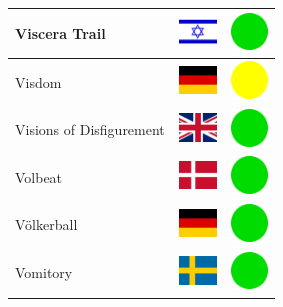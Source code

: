 \documentclass[12pt, a4paper, twoside]{report}
\begin{document}
\begin{center}
\begin{longtable}{|p{5cm}|p{2cm}|p{2cm}|}
 Viscera Trail                                              & \includegraphics[width=1cm]{4x3/il} &   \includegraphics[width=1cm]{likes/y} \\ \hline
 Visdom                                                     & \includegraphics[width=1cm]{4x3/de} &   \includegraphics[width=1cm]{likes/m} \\ \hline
 Visions of Disfigurement                                   & \includegraphics[width=1cm]{4x3/gb} &   \includegraphics[width=1cm]{likes/y} \\ \hline
 Volbeat                                                    & \includegraphics[width=1cm]{4x3/dk} &   \includegraphics[width=1cm]{likes/y} \\ \hline
 Völkerball                                                 & \includegraphics[width=1cm]{4x3/de} &   \includegraphics[width=1cm]{likes/y} \\ \hline
 Vomitory                                                   & \includegraphics[width=1cm]{4x3/se} &   \includegraphics[width=1cm]{likes/y} \\ \hline

\end{longtable}
\end{center}
\end{document}
